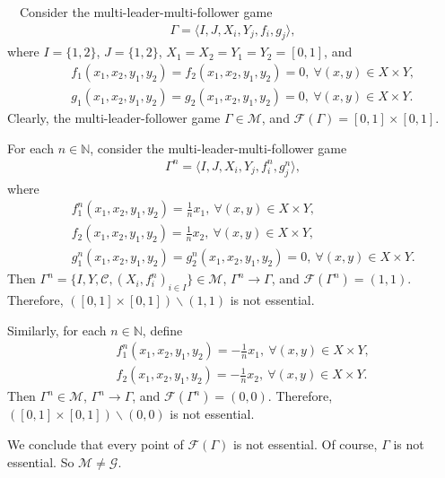 ~~Consider the multi-leader-multi-follower game
\begin{eqnarray*}
\Gamma=\langle I,J,X_i,Y_j,f_i,g_j\rangle,
\end{eqnarray*}
where $I=\{1,2\}$, $J=\{1,2\}$, $X_1=X_2=Y_1=Y_2=[0,1]$,
and
\begin{eqnarray*}
&&f_1(x_1,x_2,y_1,y_2)=f_2(x_1,x_2,y_1,y_2)=0,\ \forall (x,y)\in X\times Y,\\
&&g_1(x_1,x_2,y_1,y_2)=g_2(x_1,x_2,y_1,y_2)=0,\ \forall (x,y)\in X\times Y.
\end{eqnarray*}
Clearly, the multi-leader-follower game $\Gamma\in \mathcal{M}$,
and $\mathcal{F}(\Gamma)=[0,1]\times [0,1]$.

For each $n\in \mathbb{N}$, consider the multi-leader-multi-follower game
\begin{eqnarray*}
\Gamma^n=\langle I,J,X_i,Y_j,f^n_i,g^n_j\rangle,
\end{eqnarray*}
where
\begin{eqnarray*}
&&f^n_1(x_1,x_2,y_1,y_2)=\frac{1}{n}x_1,\ \forall (x,y)\in X\times Y,\\
&&f_2(x_1,x_2,y_1,y_2)=\frac{1}{n}x_2,\ \forall (x,y)\in X\times Y,\\
&&g^n_1(x_1,x_2,y_1,y_2)=g^n_2(x_1,x_2,y_1,y_2)=0,\ \forall (x,y)\in X\times Y.
\end{eqnarray*}
Then $\Gamma^n=\{I,Y,\mathcal{C},(X_i,f^n_i)_{i\in I}\}\in \mathcal{M}$, $\Gamma^n\longrightarrow \Gamma$, and
$\mathcal{F}(\Gamma^n)=(1,1)$. Therefore, $([0,1]\times [0,1])\backslash (1,1)$
is not essential.

Similarly, for each $n\in \mathbb{N}$, define
\begin{eqnarray*}
&&f^n_1(x_1,x_2,y_1,y_2)=-\frac{1}{n}x_1,\ \forall (x,y)\in X\times Y,\\
&&f_2(x_1,x_2,y_1,y_2)=-\frac{1}{n}x_2,\ \forall (x,y)\in X\times Y.
\end{eqnarray*}
Then $\Gamma^n\in \mathcal{M}$, $\Gamma^n\longrightarrow \Gamma$, and
$\mathcal{F}(\Gamma^n)=(0,0)$. Therefore, $([0,1]\times [0,1])\backslash (0,0)$
is not essential.

We conclude that every point of $\mathcal{F}(\Gamma)$ is not essential.
Of course, $\Gamma$  is not essential.  So $\mathcal{M}\neq \mathcal{G}$.








